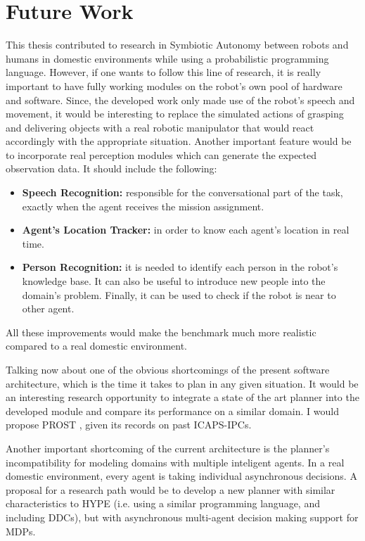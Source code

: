 \chapter{Future Work}
This thesis contributed to research in Symbiotic Autonomy between robots and 
humans in domestic environments while using a probabilistic programming language.
However, if one wants to follow this line of research, it is really important to 
have fully working modules on the robot's own pool of hardware and software. Since, 
the developed work only made use of the robot's speech and movement, it would be 
interesting to replace the simulated actions of grasping and delivering objects 
with a real robotic manipulator that would react accordingly with the appropriate 
situation.
Another important feature would be to incorporate real perception modules which 
can generate the expected observation data. It should include the following:
\begin{itemize}
    \item \textbf{Speech Recognition:} responsible for the conversational 
part of the task, exactly when the agent receives the mission assignment.
    \item \textbf{Agent's Location Tracker:} in order to know each agent's 
    location in real time.
    \item \textbf{Person Recognition:} it is needed to identify each person in the 
    robot's knowledge base. It can also be useful to introduce new people into the
    domain's problem. Finally, it can be used to check if the robot is near to other
    agent.
\end{itemize}
All these improvements would make the benchmark much more realistic compared to a real 
domestic environment.

Talking now about one of the obvious shortcomings of the present software architecture, 
which is the time it takes to plan in any given situation. It would be an interesting 
research opportunity to integrate a state of the art planner into the developed module and 
compare its performance on a similar domain. I would propose PROST \cite{keller2012prost}, 
given its records on past \glspl{ICAPS-IPC}.

Another important shortcoming of the current architecture is the planner's incompatibility
for modeling domains with multiple inteligent agents. In a real domestic environment, every 
agent is taking individual asynchronous decisions. A proposal for a research path would be to
develop a new planner with similar characteristics to \gls{HYPE} (i.e. using a similar programming
language, and including \glspl{DDC}), but with asynchronous multi-agent decision making support for
\glspl{MDP}.



